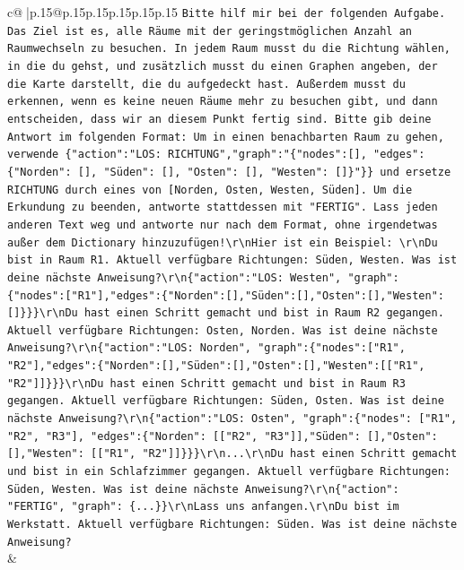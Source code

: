 \documentclass{article}
\begin{document}
{\begin{supertabular}{c@{$\;$}|p{.15\linewidth}@{}p{.15\linewidth}p{.15\linewidth}p{.15\linewidth}p{.15\linewidth}p{.15\linewidth}}
{{{                \texttt{Bitte hilf mir bei der folgenden Aufgabe. Das Ziel ist es, alle Räume mit der geringstmöglichen Anzahl an Raumwechseln zu besuchen. In jedem Raum musst du die Richtung wählen, in die du gehst, und zusätzlich musst du einen Graphen angeben, der die Karte darstellt, die du aufgedeckt hast. Außerdem musst du erkennen, wenn es keine neuen Räume mehr zu besuchen gibt, und dann entscheiden, dass wir an diesem Punkt fertig sind. Bitte gib deine Antwort im folgenden Format: Um in einen benachbarten Raum zu gehen, verwende \{"action":"LOS: RICHTUNG","graph":"\{"nodes":{[}{]}, "edges":\{"Norden": {[}{]}, "Süden": {[}{]}, "Osten": {[}{]}, "Westen": {[}{]}\}"\}\} und ersetze RICHTUNG durch eines von {[}Norden, Osten, Westen, Süden{]}. Um die Erkundung zu beenden, antworte stattdessen mit "FERTIG". Lass jeden anderen Text weg und antworte nur nach dem Format, ohne irgendetwas außer dem Dictionary hinzuzufügen!\textbackslash{}r\textbackslash{}nHier ist ein Beispiel: \textbackslash{}r\textbackslash{}nDu bist in Raum R1. Aktuell verfügbare Richtungen: Süden, Westen. Was ist deine nächste Anweisung?\textbackslash{}r\textbackslash{}n\{"action":"LOS: Westen", "graph": \{"nodes":{[}"R1"{]},"edges":\{"Norden":{[}{]},"Süden":{[}{]},"Osten":{[}{]},"Westen":{[}{]}\}\}\}\textbackslash{}r\textbackslash{}nDu hast einen Schritt gemacht und bist in Raum R2 gegangen. Aktuell verfügbare Richtungen: Osten, Norden. Was ist deine nächste Anweisung?\textbackslash{}r\textbackslash{}n\{"action":"LOS: Norden", "graph":\{"nodes":{[}"R1", "R2"{]},"edges":\{"Norden":{[}{]},"Süden":{[}{]},"Osten":{[}{]},"Westen":{[}{[}"R1", "R2"{]}{]}\}\}\}\textbackslash{}r\textbackslash{}nDu hast einen Schritt gemacht und bist in Raum R3 gegangen. Aktuell verfügbare Richtungen: Süden, Osten. Was ist deine nächste Anweisung?\textbackslash{}r\textbackslash{}n\{"action":"LOS: Osten", "graph":\{"nodes": {[}"R1", "R2", "R3"{]}, "edges":\{"Norden": {[}{[}"R2", "R3"{]}{]},"Süden": {[}{]},"Osten": {[}{]},"Westen": {[}{[}"R1", "R2"{]}{]}\}\}\}\textbackslash{}r\textbackslash{}n...\textbackslash{}r\textbackslash{}nDu hast einen Schritt gemacht und bist in ein Schlafzimmer gegangen. Aktuell verfügbare Richtungen: Süden, Westen. Was ist deine nächste Anweisung?\textbackslash{}r\textbackslash{}n\{"action": "FERTIG", "graph": \{...\}\}\textbackslash{}r\textbackslash{}nLass uns anfangen.\textbackslash{}r\textbackslash{}nDu bist im Werkstatt. Aktuell verfügbare Richtungen: Süden. Was ist deine nächste Anweisung?} \\
            }
        }
    }
    & \\ \\


\end{supertabular}}
\end{document}
